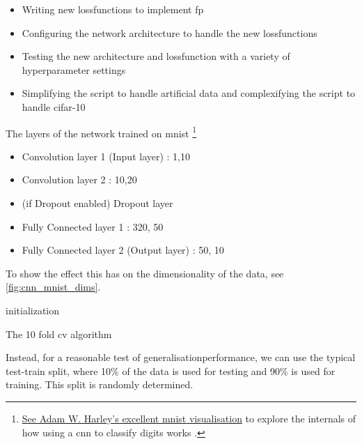 \begin{itemize}
    \itemsep-1em 
    \item Writing new \gls{lossfunction}s to implement \gls{fp}
    \item Configuring the network architecture to handle the new \gls{lossfunction}s
    \item Testing the new architecture and \gls{lossfunction} with a variety of \gls{hyperparameter} settings
    \item Simplifying the script to handle artificial data and complexifying the script to handle \gls{cifar}-10
\end{itemize}

The layers of the network trained on \gls{mnist} \footnote{\href{https://www.cs.ryerson.ca/~aharley/vis/conv/}{See Adam W. Harley's excellent \gls{mnist} visualisation} to explore the internals of how using a \gls{cnn} to classify digits works \cite{mnist_viz}.}

\begin{itemize}
    \itemsep-1em 
    \item Convolution layer 1 (Input layer) : 1,10
    \item Convolution layer 2 : 10,20
    \item (if Dropout enabled) Dropout layer 
    \item Fully Connected layer 1 : 320, 50
    \item Fully Connected layer 2 (Output layer) : 50, 10
\end{itemize}

To show the effect this has on the dimensionality of the data, see \ref{fig:cnn_mnist_dims}. 


\bigskip

\begin{algorithm}[H]
\SetAlgoLined
{}
 initialization\;
    \caption{The 10 fold \gls{cv} algorithm}
    \label{algo:10-fold-cv}
\end{algorithm}


\bigskip

Instead, for a reasonable test of \gls{generalisationperformance}, we can use the typical test-train split, where 10\% of the data is used for testing and 90\% is used for training. This split is randomly determined.
\bigskip

